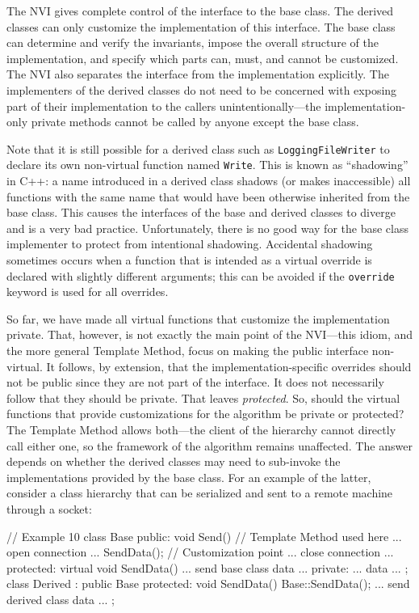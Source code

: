The NVI gives complete control of the interface to the base class. The derived classes can only customize the implementation of this interface. The base class can determine and verify the invariants, impose the overall structure of the implementation, and specify which parts can, must, and cannot be customized. The NVI also separates the interface from the implementation explicitly. The implementers of the derived classes do not need to be concerned with exposing part of their implementation to the callers unintentionally---the implementation-only private methods cannot be called by anyone except the base class.

Note that it is still possible for a derived class such as \texttt{LoggingFileWriter} to declare its own non-virtual function named \texttt{Write}. This is known as ``shadowing'' in C++: a name introduced in a derived class shadows (or makes inaccessible) all functions with the same name that would have been otherwise inherited from the base class. This causes the interfaces of the base and derived classes to diverge and is a very bad practice. Unfortunately, there is no good way for the base class implementer to protect from intentional shadowing. Accidental shadowing sometimes occurs when a function that is intended as a virtual override is declared with slightly different arguments; this can be avoided if the \texttt{override} keyword is used for all overrides.

So far, we have made all virtual functions that customize the implementation private. That, however, is not exactly the main point of the NVI---this idiom, and the more general Template Method, focus on making the public interface non-virtual. It follows, by extension, that the implementation-specific overrides should not be public since they are not part of the interface. It does not necessarily follow that they should be private. That leaves \emph{protected}. So, should the virtual functions that provide customizations for the algorithm be private or protected? The Template Method allows both---the client of the hierarchy cannot directly call either one, so the framework of the algorithm remains unaffected. The answer depends on whether the derived classes may need to sub-invoke the implementations provided by the base class. For an example of the latter, consider a class hierarchy that can be serialized and sent to a remote machine through a socket:

\begin{code}
// Example 10
class Base {
  public:
  void Send() { // Template Method used here
    ... open connection ...
    SendData(); // Customization point
    ... close connection ...
  }
  protected:
  virtual void SendData() { ... send base class data ... }
  private:
  ... data ...
};
class Derived : public Base {
  protected:
  void SendData() {
    Base::SendData();
    ... send derived class data ...
  }
};
\end{code}


